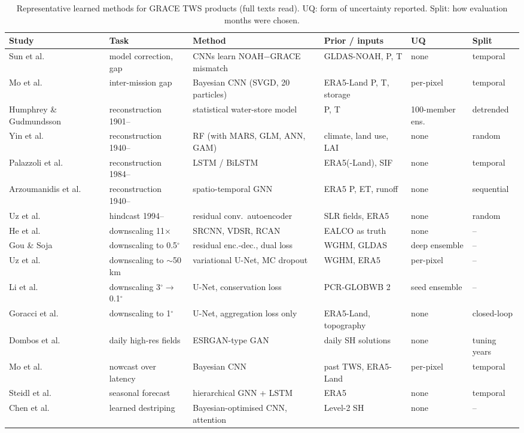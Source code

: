 \begin{table}[!t]
\centering
\caption{Representative learned methods for GRACE TWS products (full texts read). UQ: form of uncertainty reported. Split: how evaluation months were chosen.}
\label{tab:mlgrace}
\footnotesize
\begin{tabularx}{\textwidth}{@{}l l L L l l@{}}
\toprule
Study & Task & Method & Prior / inputs & UQ & Split \\
\midrule
Sun et al.~\cite{sun2019combining} & model correction, gap & CNNs learn NOAH$-$GRACE mismatch & GLDAS-NOAH, P, T & none & temporal \\
Mo et al.~\cite{mo2022bayesian} & inter-mission gap & Bayesian CNN (SVGD, 20 particles) & ERA5-Land P, T, storage & per-pixel & temporal \\
Humphrey \& Gudmundsson~\cite{humphrey2019gracerec} & reconstruction 1901-- & statistical water-store model & P, T & 100-member ens. & detrended \\
Yin et al.~\cite{yin2023gtwsmlrec} & reconstruction 1940-- & RF (with MARS, GLM, ANN, GAM) & climate, land use, LAI & none & random \\
Palazzoli et al.~\cite{palazzoli2025graice} & reconstruction 1984-- & LSTM / BiLSTM & ERA5(-Land), SIF & none & temporal \\
Arzoumanidis et al.~\cite{arzoumanidis2026stgnn} & reconstruction 1940-- & spatio-temporal GNN & ERA5 P, ET, runoff & none & sequential \\
Uz et al.~\cite{uz2024highres} & hindcast 1994-- & residual conv.\ autoencoder & SLR fields, ERA5 & none & random \\
He et al.~\cite{he2021deep} & downscaling 11$\times$ & SRCNN, VDSR, RCAN & EALCO as truth & none & -- \\
Gou \& Soja~\cite{gou2024global} & downscaling to 0.5$^\circ$ & residual enc.-dec., dual loss & WGHM, GLDAS & deep ensemble & -- \\
Uz et al.~\cite{uz2026dynamic} & downscaling to $\sim$50\,km & variational U-Net, MC dropout & WGHM, ERA5 & per-pixel & -- \\
Li et al.~\cite{li2026physically} & downscaling 3$^\circ\!\to$0.1$^\circ$ & U-Net, conservation loss & PCR-GLOBWB 2 & seed ensemble & -- \\
Goracci et al.~\cite{goracci2026nggm} & downscaling to 1$^\circ$ & U-Net, aggregation loss only & ERA5-Land, topography & none & closed-loop \\
Dombos et al.~\cite{dombos2026dshift} & daily high-res fields & ESRGAN-type GAN & daily SH solutions & none & tuning years \\
Mo et al.~\cite{mo2025nearrealtime} & nowcast over latency & Bayesian CNN & past TWS, ERA5-Land & per-pixel & temporal \\
Steidl et al.~\cite{steidl2026hignn} & seasonal forecast & hierarchical GNN + LSTM & ERA5 & none & temporal \\
Chen et al.~\cite{chen2025efficient} & learned destriping & Bayesian-optimised CNN, attention & Level-2 SH & none & -- \\
\bottomrule
\end{tabularx}
\end{table}

